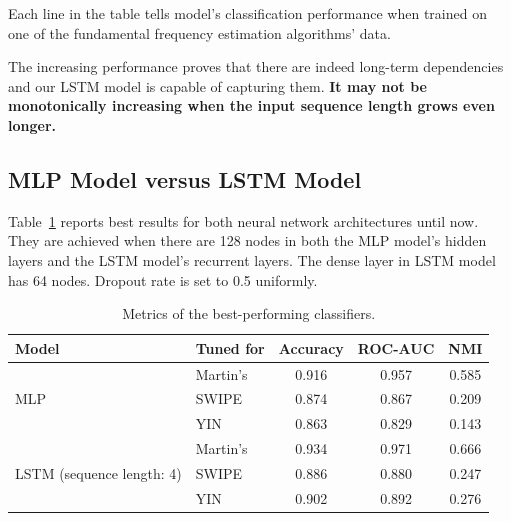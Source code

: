 \documentclass[11pt,a4paper,titlepage]{article}
\begin{document}
Each line in the table tells model's classification performance when trained on one of the fundamental frequency estimation algorithms' data.

\bigskip

The increasing performance proves that there are indeed long-term dependencies and our LSTM model is capable of capturing them.
\textbf{It may not be monotonically increasing when the input sequence length grows even longer.}

\newpage

\subsection{MLP Model versus LSTM Model}

Table~\ref{tab:metrics} reports best results for both neural network architectures until now.
They are achieved when there are 128 nodes in both the MLP model's hidden layers and the LSTM model's recurrent layers.
The dense layer in LSTM model has 64 nodes.
Dropout rate is set to 0.5 uniformly.

\begin{table}[htbp]
  \centering
  \begin{tabular}{llccc}
  	\toprule
  	Model                                      & Tuned for & Accuracy & ROC-AUC &  NMI  \\
  	\midrule
  	\multirow{3}{*}{MLP}                       & Martin's  &  0.916   &  0.957  & 0.585 \\
  	                                           & SWIPE     &  0.874   &  0.867  & 0.209 \\
  	                                           & YIN       &  0.863   &  0.829  & 0.143 \\
  	\midrule
  	\multirow{3}{*}{LSTM (sequence length: 4)} & Martin's  &  0.934   &  0.971  & 0.666 \\
  	                                           & SWIPE     &  0.886   &  0.880  & 0.247 \\
  	                                           & YIN       &  0.902   &  0.892  & 0.276 \\
  	\bottomrule
  \end{tabular}
  \caption{Metrics of the best-performing classifiers.} \label{tab:metrics}
\end{table}
\end{document}
